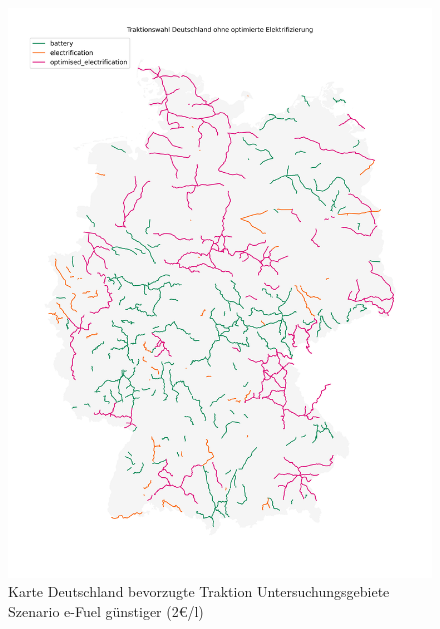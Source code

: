 \begin{center}
	\begin{figure}[p]
	\includegraphics[height=0.8\textheight]{../report_scenarios/s_20/files/deutschland_map}
	\caption{\label{fig_s_20_d_map} Karte Deutschland bevorzugte Traktion Untersuchungsgebiete Szenario e-Fuel günstiger (2€/l)}
	\end{figure}
\end{center}


